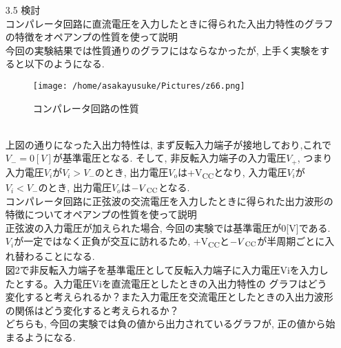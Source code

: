 \documentclass[uplatex,a4paper,11pt,dvipdfmxs]{jsarticle}
\begin{document}
\begin{enumerate}
\begin{enumerate}
        \item[3.5] 検討\\
        コンパレータ回路に直流電圧を入力したときに得られた入出力特性のグラフの特徴をオペアンプの性質を使って説明\\
        今回の実験結果では性質通りのグラフにはならなかったが, 上手く実験をすると以下のようになる. 
        \begin{figure}[H]
            \centering
            \texttt{[image: /home/asakayusuke/Pictures/z66.png]}
            \caption{コンパレータ回路の性質}
        \end{figure}
        \\
        上図の通りになった入出力特性は, まず反転入力端子が接地しており,これで\(V_-=0[V]\)が基準電圧となる. そして, 
        非反転入力端子の入力電圧\(V_+\), つまり入力電圧\(V_i\)が\(V_i>V_-\)のとき, 出力電圧\(V_o\)は+V\textsubscript{CC}となり, 
        入力電圧\(V_i\)が\(V_i<V_-\)のとき, 出力電圧\(V_o\)は\(-V\textsubscript{CC}\)となる. \\

        コンパレータ回路に正弦波の交流電圧を入力したときに得られた出力波形の特徴についてオペアンプの性質を使って説明\\
        
        正弦波の入力電圧が加えられた場合, 今回の実験では基準電圧が0[V]である. \(V_i\)が一定ではなく正負が交互に訪れるため, 
        +V\textsubscript{CC}と\(-V\textsubscript{CC}\)が半周期ごとに入れ替わることになる. \\

        図2で非反転入力端子を基準電圧として反転入力端子に入力電圧Viを入力したとする。入力電圧Viを直流電圧としたときの入出力特性の
        グラフはどう変化すると考えられるか？また入力電圧を交流電圧としたときの入出力波形の関係はどう変化すると考えられるか？
        \\

        どちらも, 今回の実験では負の値から出力されているグラフが, 正の値から始まるようになる. \\


\end{enumerate}
\end{enumerate}
\end{document}
